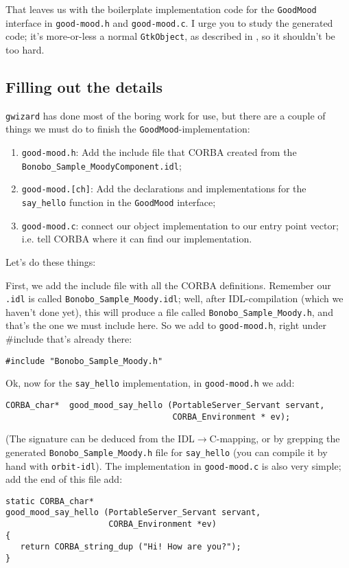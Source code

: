 \documentclass[final,10pt]{article}
\newcommand{\gwizard}{{\tt gwizard}}
\begin{document}
That leaves us with the boilerplate implementation code for the
\verb|GoodMood| interface in \verb|good-mood.h| and
\verb|good-mood.c|. I urge you to study the generated code; it's
more-or-less a normal \verb|GtkObject|, as described in
\cite{Pennington99}, so it shouldn't be too hard.

\subsection{Filling out the details}
\gwizard{} has done most of the boring work for use, but there are a couple
of things we must do to finish the \verb|GoodMood|-implementation:
\begin{enumerate}
  \item \verb|good-mood.h|: Add the include file that CORBA created from the
  \verb|Bonobo_Sample_MoodyComponent.idl|; 
  \item \verb|good-mood.[ch]|: Add the declarations and
  implementations for the \verb|say_hello| function in the
  \verb|GoodMood| interface;
  \item \verb|good-mood.c|: connect our object implementation to our
  entry point vector; i.e. tell CORBA where it can find our implementation.
\end{enumerate}

Let's do these things:

First, we add the include file with all the CORBA
definitions. Remember our \verb|.idl| is called
\verb|Bonobo_Sample_Moody.idl|; well, after IDL-compilation
(which we haven't done yet), this will produce a file called
\verb|Bonobo_Sample_Moody.h|, and that's the one we must
include here. So we add to \verb|good-mood.h|, right under \#include
that's already there:
\begin{verbatim}
#include "Bonobo_Sample_Moody.h"
\end{verbatim}

Ok, now for the \verb|say_hello| implementation, in \verb|good-mood.h|
we add:
\begin{verbatim}
CORBA_char*  good_mood_say_hello (PortableServer_Servant servant,
                                  CORBA_Environment * ev);
\end{verbatim}
(The signature can be deduced from the IDL$\to$C-mapping, or by
grepping the generated \verb|Bonobo_Sample_Moody.h| file for
\verb|say_hello| (you can
compile it by hand with \verb|orbit-idl|). 
The implementation in \verb|good-mood.c| is also very simple; add the
end of this file add:
\begin{verbatim}
static CORBA_char*
good_mood_say_hello (PortableServer_Servant servant,
                     CORBA_Environment *ev)
{
   return CORBA_string_dup ("Hi! How are you?");
}
\end{verbatim}
\end{document}
